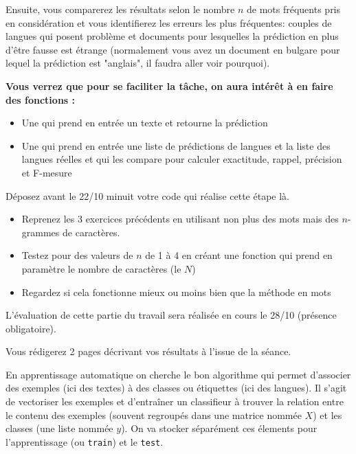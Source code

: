 Ensuite, vous comparerez les résultats selon le nombre $n$ de mots fréquents pris en considération et vous identifierez les erreurs les plus fréquentes: couples de langues qui posent problème et documents pour lesquelles la prédiction en plus d'être fausse est étrange (normalement vous avez un document en bulgare pour lequel la prédiction est "anglais", il faudra aller voir pourquoi).

\textbf{Vous verrez que pour se faciliter la tâche, on aura intérêt à en faire des fonctions :}

\begin{itemize}
  \item Une qui prend en entrée un texte et retourne la prédiction
  \item Une qui prend en entrée une liste de prédictions de langues et la liste des langues réelles et qui les compare pour calculer exactitude, rappel, précision et F-mesure 
\end{itemize}

Déposez avant le 22/10 minuit votre code qui réalise cette étape là.

\vspace{0.5cm}
\vspace{0.5cm}

\begin{itemize}
  \item Reprenez les 3 exercices précédents en utilisant non plus des mots mais des $n$-grammes de caractères.
  \item Testez pour des valeurs de $n$ de 1 à 4 en créant une fonction qui prend en paramètre le nombre de caractères (le $N$)
  \item Regardez si cela fonctionne mieux ou moins bien que la méthode en mots
\end{itemize}

L'évaluation de cette partie du travail sera réalisée en cours le 28/10 (présence obligatoire).

Vous rédigerez 2 pages décrivant vos résultats à l'issue de la séance.


\vspace{0.5cm}
\vspace{0.5cm}


 En apprentissage automatique on cherche le bon algorithme qui permet d'associer des exemples (ici des textes) à des classes ou étiquettes (ici des langues).
Il s'agit de vectoriser les exemples et d'entraîner un classifieur à trouver la relation entre le contenu des exemples (souvent regroupés dans une matrice nommée $X$) et les classes (une liste nommée $y$). On va stocker séparément ces élements pour l'apprentissage (ou \texttt{train}) et le \texttt{test}.

